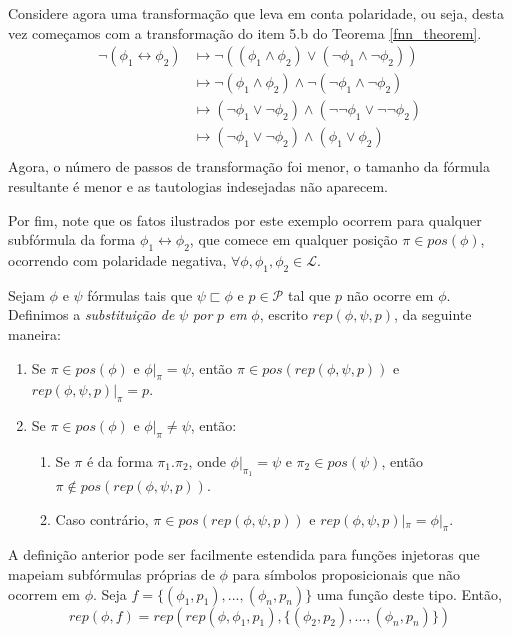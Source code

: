 \begin{example}
    Considere agora uma transformação que leva em conta polaridade, ou seja, desta vez começamos com a transformação do item 5.b do Teorema \ref{fnn_theorem}.
    \begin{equation*}
        \begin{split}
            \neg(\phi_1 \leftrightarrow \phi_2) & \longmapsto \neg((\phi_1 \wedge \phi_2) \vee (\neg \phi_1 \wedge \neg \phi_2)) \\
                 & \longmapsto \neg(\phi_1 \wedge \phi_2) \wedge \neg(\neg \phi_1 \wedge \neg \phi_2) \\
                 & \longmapsto (\neg \phi_1 \vee \neg \phi_2) \wedge (\neg \neg \phi_1 \vee \neg \neg \phi_2) \\
                 & \longmapsto (\neg \phi_1 \vee \neg \phi_2) \wedge (\phi_1 \vee \phi_2) \\
        \end{split}
    \end{equation*}
    Agora, o número de passos de transformação foi menor, o tamanho da fórmula resultante é menor e as tautologias indesejadas não aparecem.
    
    Por fim, note que os fatos ilustrados por este exemplo ocorrem para qualquer subfórmula da forma $\phi_1 \leftrightarrow \phi_2$, que comece em qualquer posição $\pi \in pos(\phi)$, ocorrendo com polaridade negativa, $\forall \phi,\phi_1,\phi_2 \in \mathcal{L}$.
\end{example}

\begin{definition}
	Sejam $\phi$ e $\psi$ fórmulas tais que $\psi \sqsubset \phi$ e $p \in \mathcal{P}$ tal que $p$ não ocorre em $\phi$. Definimos a \emph{substituição de} $\psi$ \emph{por} $p$ \emph{em} $\phi$, escrito $rep(\phi,\psi,p)$, da seguinte maneira:
	\begin{enumerate}
		\item Se $\pi \in pos(\phi)$ e $\phi|_\pi = \psi$, então $\pi \in pos(rep(\phi,\psi,p))$ e $rep(\phi,\psi,p)|_\pi = p$.
		\item Se $\pi \in pos(\phi)$ e $\phi|_\pi \neq \psi$, então:
		\begin{enumerate}
			\item Se $\pi$ é da forma $\pi_1.\pi_2$, onde $\phi|_{\pi_1} = \psi$ e $\pi_2 \in pos(\psi)$, então\break $\pi \notin pos(rep(\phi,\psi,p))$.
			\item Caso contrário, $\pi \in pos(rep(\phi,\psi,p))$ e $rep(\phi,\psi,p)|_\pi = \phi|_\pi$.
		\end{enumerate}
	\end{enumerate}
	
	A definição anterior pode ser facilmente estendida para funções injetoras que mapeiam subfórmulas próprias de $\phi$ para símbolos proposicionais que não ocorrem em $\phi$. Seja $f = \{(\phi_1,p_1),...,(\phi_n,p_n)\}$ uma função deste tipo. Então, $$rep(\phi,f) = rep(rep(\phi,\phi_1,p_1),\{(\phi_2,p_2),...,(\phi_n,p_n)\})$$
\end{definition}

